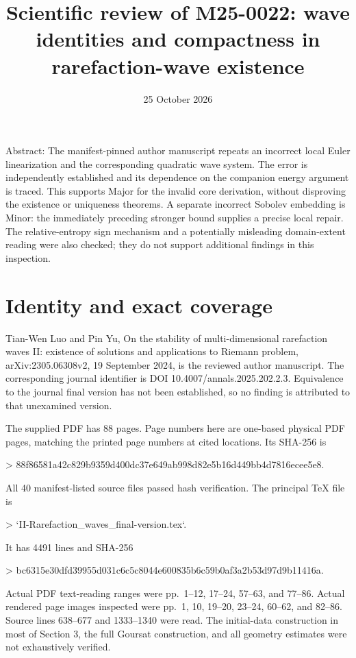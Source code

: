 \documentclass[10pt]{article}
\title{Scientific review of M25-0022:
wave identities and compactness in rarefaction-wave existence}
\author{}
\date{25 October 2026}
\begin{document}
\maketitle
Abstract: The manifest-pinned author manuscript repeats an incorrect local Euler linearization and the corresponding quadratic wave system. The error is independently established and its dependence on the companion energy argument is traced. This supports Major for the invalid core derivation, without disproving the existence or uniqueness theorems. A separate incorrect Sobolev embedding is Minor: the immediately preceding stronger bound supplies a precise local repair. The relative-entropy sign mechanism and a potentially misleading domain-extent reading were also checked; they do not support additional findings in this inspection.\par
\section*{Identity and exact coverage}
Tian-Wen Luo and Pin Yu, On the stability of multi-dimensional rarefaction waves II: existence of solutions and applications to Riemann problem, arXiv:2305.06308v2, 19 September 2024, is the reviewed author manuscript. The corresponding journal identifier is DOI 10.4007/annals.2025.202.2.3. Equivalence to the journal final version has not been established, so no finding is attributed to that unexamined version.\par
The supplied PDF has 88 pages. Page numbers here are one-based physical PDF pages, matching the printed page numbers at cited locations. Its SHA-256 is\par
> 88f86581a42c829b9359d400dc37e649ab998d82e5b16d449bb4d7816ecee5e8.\par
All 40 manifest-listed source files passed hash verification. The principal TeX file is\par
> `II-Rarefaction\_waves\_final-version.tex`.\par
It has 4491 lines and SHA-256\par
> bc6315e30dfd39955d031c6c5c8044e600835b6c59b0af3a2b53d97d9b11416a.\par
Actual PDF text-reading ranges were pp. 1–12, 17–24, 57–63, and 77–86. Actual rendered page images inspected were pp. 1, 10, 19–20, 23–24, 60–62, and 82–86. Source lines 638–677 and 1333–1340 were read. The initial-data construction in most of Section 3, the full Goursat construction, and all geometry estimates were not exhaustively verified.\par
\end{document}
